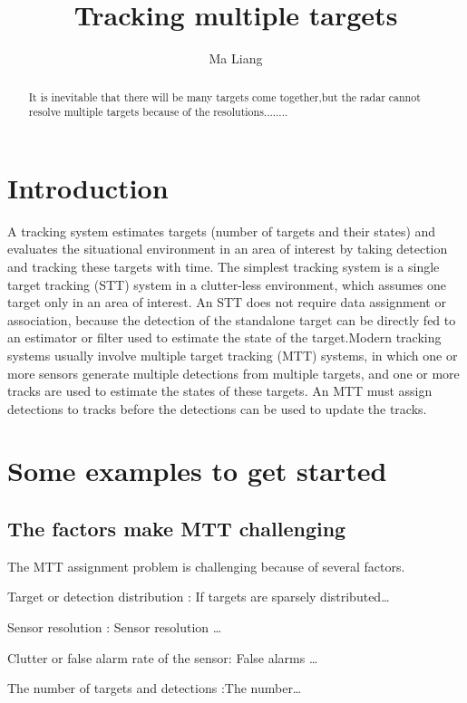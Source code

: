 \documentclass{article}
\title{Tracking multiple targets }
\author{Ma Liang}
\begin{document}
\maketitle

\begin{abstract}
It is inevitable that there will be many targets come together,but the radar cannot  resolve multiple targets because of the resolutions........ 
\end{abstract}

\section{Introduction}
A tracking system estimates targets (number of targets and their states) and evaluates the situational environment in an area of interest by taking detection and tracking these targets with time. The simplest tracking system is a single target tracking (STT) system in a clutter-less environment, which assumes one target only in an area of interest. An STT does not require data assignment or association, because the detection of the standalone target can be directly fed to an estimator or filter used to estimate the state of the target.Modern tracking systems usually involve multiple target tracking (MTT) systems, in which one or more sensors generate multiple detections from multiple targets, and one or more tracks are used to estimate the states of these targets. An MTT must assign detections to tracks before the detections can be used to update the tracks. 

\section{Some examples to get started}

\subsection{The factors make MTT challenging}
The MTT assignment problem is challenging because of several factors.

Target or detection distribution : If targets are sparsely distributed\dots

Sensor resolution : Sensor resolution \dots

Clutter or false alarm rate of the sensor: False alarms \dots

The number of targets and detections :The number\dots
\end{document}
